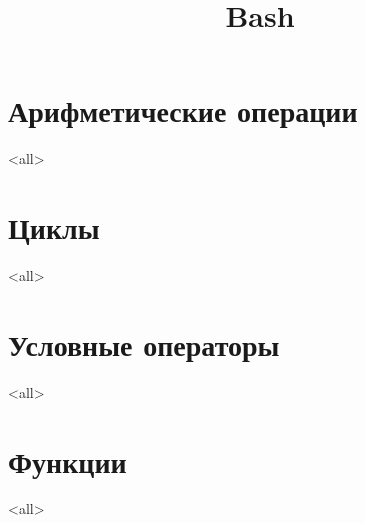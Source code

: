 



\title{Bash}



\begin{frame}
  \frametitle{}
  \titlepage
\end{frame}

\section{Арифметические операции}
\mode<all>{}
\section{Циклы}
\mode<all>{}
\section{Условные операторы}
\mode<all>{}
\section{Функции}
\mode<all>{}


